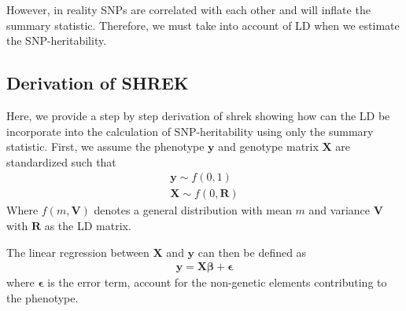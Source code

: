 \documentclass[12pt]{scrbook}
\begin{document}
However, in reality \glspl{SNP} are correlated with each other and will inflate the summary statistic. 
Therefore, we must take into account of \gls{LD} when we estimate the \gls{SNP}-heritability.

\subsection{Derivation of SHREK}
\label{sec:derive}
Here, we provide a step by step derivation of \gls{shrek} showing how can the \gls{LD} be incorporate into the calculation of \gls{SNP}-heritability using only the summary statistic.
First, we assume the phenotype $\boldsymbol{y}$ and genotype matrix  $\boldsymbol{X}$ are standardized such that
\begin{align*}
\boldsymbol{y}\sim f(0,1) \\
\boldsymbol{X}\sim f(0,\boldsymbol{R})
\end{align*}
Where $f(m, \boldsymbol{V})$ denotes a general distribution with mean $m$ and variance $\boldsymbol{V}$ with $\boldsymbol{R}$ as the \gls{LD} matrix.

The linear regression between $\boldsymbol{X}$ and $\boldsymbol{y}$ can then be defined as
\begin{align}
\boldsymbol{y}=\boldsymbol{X}\boldsymbol{\beta}+\boldsymbol{\epsilon}
\label{eq:matrixRegress}
\end{align}
where $\boldsymbol{\epsilon}$ is the error term, account for the non-genetic elements contributing to the phenotype.
\end{document}
